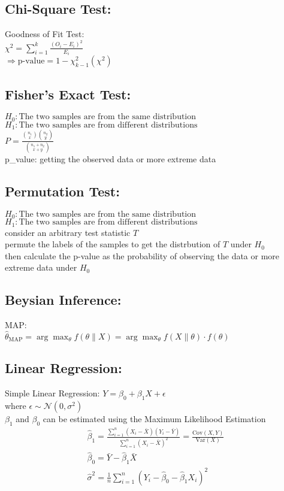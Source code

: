\subsection{Chi-Square Test:}
Goodness of Fit Test:\\
$\chi^2 = \sum_{i=1}^{k} \frac{(O_i - E_i)^2}{E_i}$\\
$\Rightarrow \text{p-value} = 1 - \chi^2_{k-1}(\chi^2)$\\

\subsection{Fisher's Exact Test:}
$H_0: \text{The two samples are from the same distribution}$\\
$H_1: \text{The two samples are from different distributions}$\\
$P = \frac{{n_1 \choose x} {n_2 \choose y}}{{n_1 + n_2 \choose x + y}}$\\
p\_value: getting the observed data or more extreme data\\

\subsection{Permutation Test:}
$H_0: \text{The two samples are from the same distribution}$\\
$H_1: \text{The two samples are from different distributions}$\\
consider an arbitrary test statistic $T$\\
permute the labels of the samples to get the distrbution of $T$ under $H_0$\\
then calculate the p-value as the probability of observing the data or more extreme data under $H_0$\\

\subsection{Beysian Inference:}
MAP: \\
$\hat{\theta}_{\text{MAP}} = \arg \max_{\theta} f(\theta \| X) = \arg \max_{\theta} f(X \| \theta) \cdot f(\theta)$\\

\subsection{Linear Regression:}
Simple Linear Regression: $Y = \beta_0 + \beta_1 X + \epsilon$\\
where $\epsilon \sim \mathcal{N}(0, \sigma^2)$\\
$\beta_1$ and $\beta_0$ can be estimated using the Maximum Likelihood Estimation\\
\[
\begin{array}{ll}
    \hat{\beta}_1 = \frac{\sum_{i=1}^{n} (X_i - \bar{X})(Y_i - \bar{Y})}{\sum_{i=1}^{n} (X_i - \bar{X})^2} = \frac{\text{Cov}(X, Y)}{\text{Var}(X)}\\
    \hat{\beta}_0 = \bar{Y} - \hat{\beta}_1 \bar{X} \\
    \hat{\sigma}^2 = \frac{1}{n} \sum_{i=1}^{n} (Y_i - \hat{\beta}_0 - \hat{\beta}_1 X_i)^2
\end{array}
\]
